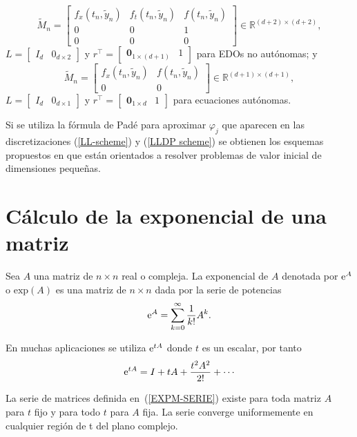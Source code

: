 \begin{equation*}
\widetilde{M}_{n}=\left[ 
\begin{array}{ccc}
f_{x}(t_{n},\widetilde{y}_{n}) &f%
_{t}(t_{n},\widetilde{y}_{n}) & f(t_{n},\widetilde{
		y}_{n}) \\ 
0 & 0 & 1 \\ 
0 & 0 & 0%
\end{array}%
\right] \in \mathbb{R}^{(d+2)\times (d+2)},
\end{equation*}%
$L=\left[ 
\begin{array}{ll}
I_{d} & 0_{d\times 2}%
\end{array}%
\right] $ y $r^{\intercal }=\left[ 
\begin{array}{ll}
\mathbf{0}_{1\times (d+1)} & 1%
\end{array}%
\right] $ para EDOs no autónomas; y 
\begin{equation*}
\widetilde{M}_{n}=\left[ 
\begin{array}{cc}
f_{x}(t_{n},\widetilde{y}_{n}) & f(t_{n},%
\widetilde{y}_{n}) \\ 
0 & 0%
\end{array}%
\right] \in \mathbb{R}^{(d+1)\times (d+1)},
\end{equation*}%
$L=\left[ 
\begin{array}{ll}
I_{d} & 0_{d\times 1}%
\end{array}%
\right] $ y $r^{\intercal }=\left[ 
\begin{array}{ll}
\mathbf{0}_{1\times d} & 1%
\end{array}%
\right] $ para ecuaciones autónomas.

Si se utiliza la fórmula de Padé para aproximar $\varphi_j$ que aparecen en las discretizaciones (\ref{LL-scheme}) y (\ref{LLDP scheme}) se obtienen los esquemas propuestos en \cite{Jimenez13,Jimenez14AMC} que están orientados a resolver problemas de valor inicial de dimensiones pequeñas. 

\section{Cálculo de la exponencial de una matriz}

\begin{definition}
    \label{EXPM}\cite{golub2013matrix} Sea $A$ una matriz de $n\times n$ real o compleja. La exponencial de $A$ denotada por
    $ \mathrm{e}^{A} $ o $\mathrm{exp}(A)$ es una matriz de $n\times n$ dada por la serie de potencias
    \[\mathrm{e}^{A}=\sum_{k=0}^{\infty}\frac{1}{k!}A^{k}.\]
\end{definition}
En muchas aplicaciones se utiliza $\mathrm{e}^{tA}$ donde $t$ es un escalar, por tanto 
\begin{equation}
\me{tA}=I+tA+\frac{t^{2}A^{2}}{2!}+\cdots\label{EXPM-SERIE}
\end{equation}
\begin{theorem}\cite{IntroMatrix}
    La serie de matrices definida en~(\ref{EXPM-SERIE}) existe para toda matriz $A$ para $t$ fijo y
    para todo $t$ para $A$ fija. La serie converge uniformemente en cualquier región de t del plano complejo.
\end{theorem}

